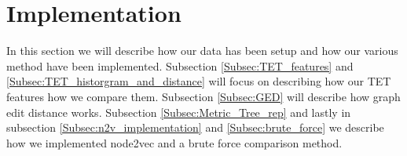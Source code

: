 \section{Implementation}\label{Sec:Implementation}
In this section we will describe how our data has been setup and how our various method have been implemented. Subsection \ref{Subsec:TET_features} and \ref{Subsec:TET_historgram_and_distance} will focus on describing how our TET features how we compare them. Subsection \ref{Subsec:GED} will describe how graph edit distance works. Subsection \ref{Subsec:Metric_Tree_rep} and lastly in subsection \ref{Subsec:n2v_implementation} and \ref{Subsec:brute_force} we describe how we implemented node2vec and a brute force comparison method.







